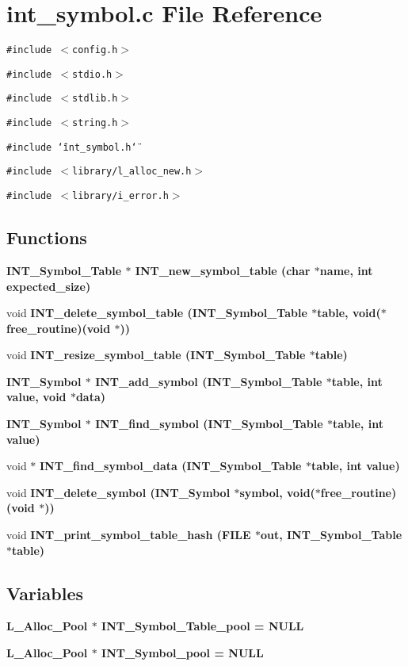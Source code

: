 \section{int\_\-symbol.c File Reference}
\label{int__symbol_8c}
{\tt \#include $<$config.h$>$}\par
{\tt \#include $<$stdio.h$>$}\par
{\tt \#include $<$stdlib.h$>$}\par
{\tt \#include $<$string.h$>$}\par
{\tt \#include \char`\"{}int\_\-symbol.h\char`\"{}}\par
{\tt \#include $<$library/l\_\-alloc\_\-new.h$>$}\par
{\tt \#include $<$library/i\_\-error.h$>$}\par
\subsection*{Functions}
\begin{CompactItemize}
\item 
\bf{INT\_\-Symbol\_\-Table} $\ast$ \bf{INT\_\-new\_\-symbol\_\-table} (char $\ast$\bf{name}, int expected\_\-size)
\item 
void \bf{INT\_\-delete\_\-symbol\_\-table} (\bf{INT\_\-Symbol\_\-Table} $\ast$table, void($\ast$free\_\-routine)(void $\ast$))
\item 
void \bf{INT\_\-resize\_\-symbol\_\-table} (\bf{INT\_\-Symbol\_\-Table} $\ast$table)
\item 
\bf{INT\_\-Symbol} $\ast$ \bf{INT\_\-add\_\-symbol} (\bf{INT\_\-Symbol\_\-Table} $\ast$table, int value, void $\ast$data)
\item 
\bf{INT\_\-Symbol} $\ast$ \bf{INT\_\-find\_\-symbol} (\bf{INT\_\-Symbol\_\-Table} $\ast$table, int value)
\item 
void $\ast$ \bf{INT\_\-find\_\-symbol\_\-data} (\bf{INT\_\-Symbol\_\-Table} $\ast$table, int value)
\item 
void \bf{INT\_\-delete\_\-symbol} (\bf{INT\_\-Symbol} $\ast$symbol, void($\ast$free\_\-routine)(void $\ast$))
\item 
void \bf{INT\_\-print\_\-symbol\_\-table\_\-hash} (FILE $\ast$out, \bf{INT\_\-Symbol\_\-Table} $\ast$table)
\end{CompactItemize}
\subsection*{Variables}
\begin{CompactItemize}
\item 
\bf{L\_\-Alloc\_\-Pool} $\ast$ \bf{INT\_\-Symbol\_\-Table\_\-pool} = NULL
\item 
\bf{L\_\-Alloc\_\-Pool} $\ast$ \bf{INT\_\-Symbol\_\-pool} = NULL
\end{CompactItemize}


